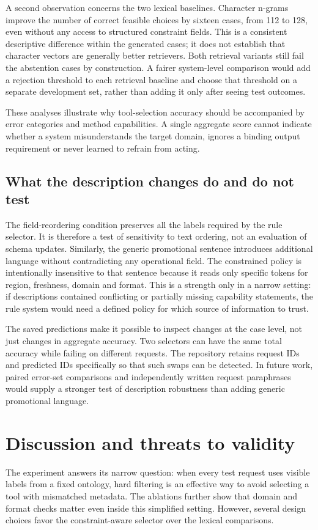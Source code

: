 \documentclass[10pt,a4paper]{article}
\begin{document}
A second observation concerns the two lexical baselines. Character n-grams improve the number of correct feasible choices by sixteen cases, from 112 to 128, even without any access to structured constraint fields. This is a consistent descriptive difference within the generated cases; it does not establish that character vectors are generally better retrievers. Both retrieval variants still fail the abstention cases by construction. A fairer system-level comparison would add a rejection threshold to each retrieval baseline and choose that threshold on a separate development set, rather than adding it only after seeing test outcomes.

These analyses illustrate why tool-selection accuracy should be accompanied by error categories and method capabilities. A single aggregate score cannot indicate whether a system misunderstands the target domain, ignores a binding output requirement or never learned to refrain from acting.

\subsection{What the description changes do and do not test}
The field-reordering condition preserves all the labels required by the rule selector. It is therefore a test of sensitivity to text ordering, not an evaluation of schema updates. Similarly, the generic promotional sentence introduces additional language without contradicting any operational field. The constrained policy is intentionally insensitive to that sentence because it reads only specific tokens for region, freshness, domain and format. This is a strength only in a narrow setting: if descriptions contained conflicting or partially missing capability statements, the rule system would need a defined policy for which source of information to trust.

The saved predictions make it possible to inspect changes at the case level, not just changes in aggregate accuracy. Two selectors can have the same total accuracy while failing on different requests. The repository retains request IDs and predicted IDs specifically so that such swaps can be detected. In future work, paired error-set comparisons and independently written request paraphrases would supply a stronger test of description robustness than adding generic promotional language.

\section{Discussion and threats to validity}
The experiment answers its narrow question: when every test request uses visible labels from a fixed ontology, hard filtering is an effective way to avoid selecting a tool with mismatched metadata. The ablations further show that domain and format checks matter even inside this simplified setting. However, several design choices favor the constraint-aware selector over the lexical comparisons.
\end{document}
